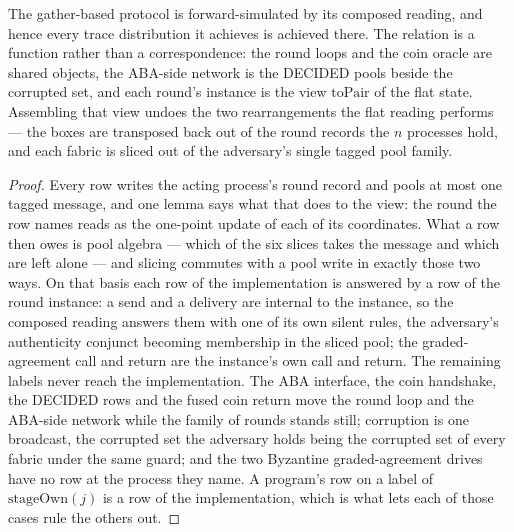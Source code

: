 \begin{theorem}
  \label{thm:aba-protocolg-composedg}
  \leanok
  The gather-based protocol is forward-simulated by its composed reading, and hence every trace distribution it achieves is achieved there.
  The relation is a function rather than a correspondence: the round loops and the coin oracle are shared objects, the ABA-side network is the DECIDED pools beside the corrupted set, and each round's instance is the view $\mathrm{toPair}$ of the flat state.
  Assembling that view undoes the two rearrangements the flat reading performs --- the boxes are transposed back out of the round records the $n$ processes hold, and each fabric is sliced out of the adversary's single tagged pool family.
\end{theorem}

\begin{proof}\leanok
  Every row writes the acting process's round record and pools at most one tagged message, and one lemma says what that does to the view: the round the row names reads as the one-point update of each of its coordinates.
  What a row then owes is pool algebra --- which of the six slices takes the message and which are left alone --- and slicing commutes with a pool write in exactly those two ways.
  On that basis each row of the implementation is answered by a row of the round instance: a send and a delivery are internal to the instance, so the composed reading answers them with one of its own silent rules, the adversary's authenticity conjunct becoming membership in the sliced pool; the graded-agreement call and return are the instance's own call and return.
  The remaining labels never reach the implementation.
  The ABA interface, the coin handshake, the DECIDED rows and the fused coin return move the round loop and the ABA-side network while the family of rounds stands still; corruption is one broadcast, the corrupted set the adversary holds being the corrupted set of every fabric under the same guard; and the two Byzantine graded-agreement drives have no row at the process they name.
  A program's row on a label of $\mathrm{stageOwn}(j)$ is a row of the implementation, which is what lets each of those cases rule the others out.
\end{proof}
